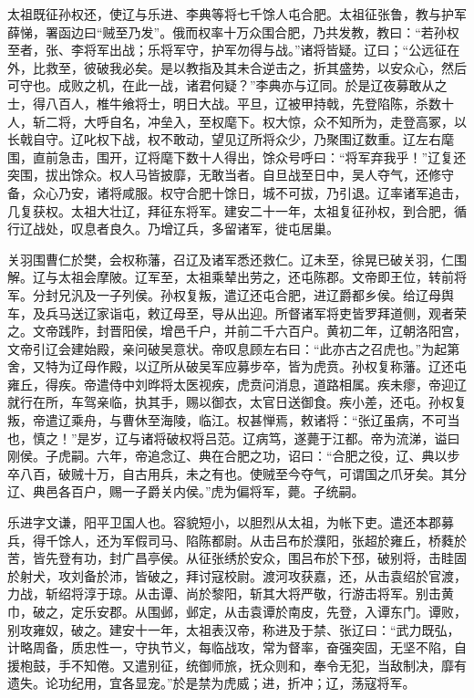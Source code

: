 \documentclass[12pt,UTF8]{ctexbook}
\begin{document}
太祖既征孙权还，使辽与乐进、李典等将七千馀人屯合肥。太祖征张鲁，教与护军薛悌，署函边曰“贼至乃发”。俄而权率十万众围合肥，乃共发教，教曰：“若孙权至者，张、李将军出战；乐将军守，护军勿得与战。”诸将皆疑。辽曰；“公远征在外，比救至，彼破我必矣。是以教指及其未合逆击之，折其盛势，以安众心，然后可守也。成败之机，在此一战，诸君何疑？”李典亦与辽同。於是辽夜募敢从之士，得八百人，椎牛飨将士，明日大战。平旦，辽被甲持戟，先登陷陈，杀数十人，斩二将，大呼自名，冲垒入，至权麾下。权大惊，众不知所为，走登高冢，以长戟自守。辽叱权下战，权不敢动，望见辽所将众少，乃聚围辽数重。辽左右麾围，直前急击，围开，辽将麾下数十人得出，馀众号呼曰：“将军弃我乎！”辽复还突围，拔出馀众。权人马皆披靡，无敢当者。自旦战至日中，吴人夺气，还修守备，众心乃安，诸将咸服。权守合肥十馀日，城不可拔，乃引退。辽率诸军追击，几复获权。太祖大壮辽，拜征东将军。建安二十一年，太祖复征孙权，到合肥，循行辽战处，叹息者良久。乃增辽兵，多留诸军，徙屯居巢。

关羽围曹仁於樊，会权称藩，召辽及诸军悉还救仁。辽未至，徐晃已破关羽，仁围解。辽与太祖会摩陂。辽军至，太祖乘辇出劳之，还屯陈郡。文帝即王位，转前将军。分封兄汎及一子列侯。孙权复叛，遣辽还屯合肥，进辽爵都乡侯。给辽母舆车，及兵马送辽家诣屯，敕辽母至，导从出迎。所督诸军将吏皆罗拜道侧，观者荣之。文帝践阼，封晋阳侯，增邑千户，并前二千六百户。黄初二年，辽朝洛阳宫，文帝引辽会建始殿，亲问破吴意状。帝叹息顾左右曰：“此亦古之召虎也。”为起第舍，又特为辽母作殿，以辽所从破吴军应募步卒，皆为虎贲。孙权复称藩。辽还屯雍丘，得疾。帝遣侍中刘晔将太医视疾，虎贲问消息，道路相属。疾未瘳，帝迎辽就行在所，车驾亲临，执其手，赐以御衣，太官日送御食。疾小差，还屯。孙权复叛，帝遣辽乘舟，与曹休至海陵，临江。权甚惮焉，敕诸将：“张辽虽病，不可当也，慎之！”是岁，辽与诸将破权将吕范。辽病笃，遂薨于江都。帝为流涕，谥曰刚侯。子虎嗣。六年，帝追念辽、典在合肥之功，诏曰：“合肥之役，辽、典以步卒八百，破贼十万，自古用兵，未之有也。使贼至今夺气，可谓国之爪牙矣。其分辽、典邑各百户，赐一子爵关内侯。”虎为偏将军，薨。子统嗣。

乐进字文谦，阳平卫国人也。容貌短小，以胆烈从太祖，为帐下吏。遣还本郡募兵，得千馀人，还为军假司马、陷陈都尉。从击吕布於濮阳，张超於雍丘，桥蕤於苦，皆先登有功，封广昌亭侯。从征张绣於安众，围吕布於下邳，破别将，击眭固於射犬，攻刘备於沛，皆破之，拜讨寇校尉。渡河攻获嘉，还，从击袁绍於官渡，力战，斩绍将淳于琼。从击谭、尚於黎阳，斩其大将严敬，行游击将军。别击黄巾，破之，定乐安郡。从围邺，邺定，从击袁谭於南皮，先登，入谭东门。谭败，别攻雍奴，破之。建安十一年，太祖表汉帝，称进及于禁、张辽曰：“武力既弘，计略周备，质忠性一，守执节义，每临战攻，常为督率，奋强突固，无坚不陷，自援枹鼓，手不知倦。又遣别征，统御师旅，抚众则和，奉令无犯，当敌制决，靡有遗失。论功纪用，宜各显宠。”於是禁为虎威；进，折冲；辽，荡寇将军。
\end{document}
